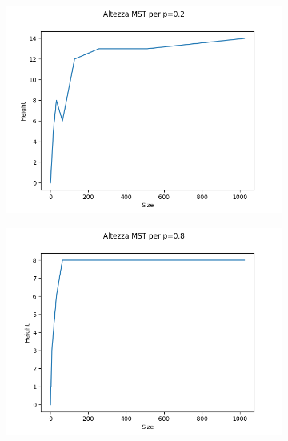 \documentclass[]{article}
\begin{document}
\begin{figure}[H]
    \centering
    \begin{subfigure}[b]{0.45\linewidth} 
        \centering
        \includegraphics[width=\textwidth]{krusk_height_p=02}
        \label{fig:quick_casuale}
    \end{subfigure}
    \quad
    \begin{subfigure}[b]{0.45\linewidth}
        \centering
        \includegraphics[width=\textwidth]{krusk_height_p=08}
        \label{fig:quick_best}
    \end{subfigure}
\end{figure}
\newpage
\end{document}
